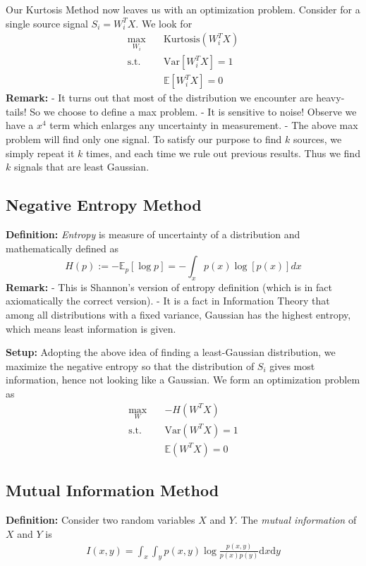 Our Kurtosis Method now leaves us with an optimization problem. Consider for a single source signal $S_i = W_i^TX$. We look for
\begin{align*}
    \max _{W_i} \quad & \text{Kurtosis}(W_i^TX) \\
    \text{s.t.} \quad & \text{Var}[W_i^T X] = 1 \\
            \quad & \mathbb{E}[W_i^TX] = 0
\end{align*}
\textbf{Remark: } \newline
- It turns out that most of the distribution we encounter are heavy-tails! So we choose to define a max problem.
\newline - It is sensitive to noise! Observe we have a $x^4$ term which enlarges any uncertainty in measurement.
\newline - The above max problem will find only one signal. To satisfy our purpose to find $k$ sources, we simply repeat it $k$ times, and each time we rule out previous results. Thus we find $k$ signals that are least Gaussian.


\subsection{Negative Entropy Method}
\textbf{Definition:} \textit{Entropy} is measure of uncertainty of a distribution and mathematically defined as $$H(p):=-\mathbb{E}_p[\log p]=-\int_x p(x)\log [p(x)]dx$$ \textbf{Remark: } \newline - This is Shannon's version of entropy definition (which is in fact axiomatically the correct version). 
\newline - It is a fact in Information Theory that among all distributions with a fixed variance, Gaussian has the highest entropy, which means least information is given.

\textbf{Setup: }\newline
Adopting the above idea of finding a least-Gaussian distribution, we maximize the negative entropy so that the distribution of $S_i$ gives most information, hence not looking like a Gaussian. We form an optimization problem as
\begin{align*}
    \max_W \quad & -H(W^TX) \\
    \text{s.t.} \quad & \text{Var}(W^TX)=1 \\
                \quad & \mathbb{E}(W^TX) = 0
\end{align*}


\subsection{Mutual Information Method}
\textbf{Definition: } Consider two random variables $X$ and $Y$. The \textit{mutual information} of $X$ and $Y$ is \begin{align*}
    I(x,y) = \int _x \int _y p(x,y) \log \frac{p(x,y)}{p(x)p(y)} \text{d}x \text{d}y
\end{align*}

